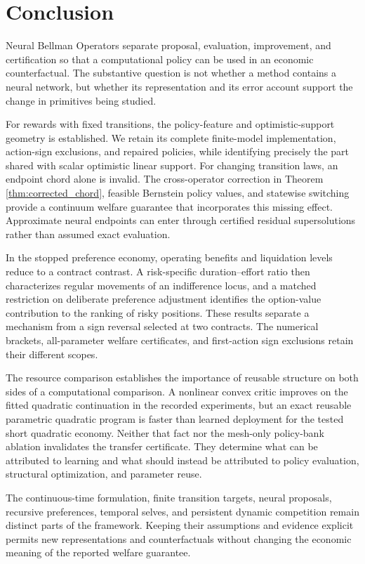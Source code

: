 \section{Conclusion}
Neural Bellman Operators separate proposal, evaluation, improvement, and certification so that a computational policy can be used in an economic counterfactual. The substantive question is not whether a method contains a neural network, but whether its representation and its error account support the change in primitives being studied.

For rewards with fixed transitions, the policy-feature and optimistic-support geometry is established. We retain its complete finite-model implementation, action-sign exclusions, and repaired policies, while identifying precisely the part shared with scalar optimistic linear support. For changing transition laws, an endpoint chord alone is invalid. The cross-operator correction in Theorem \ref{thm:corrected_chord}, feasible Bernstein policy values, and statewise switching provide a continuum welfare guarantee that incorporates this missing effect. Approximate neural endpoints can enter through certified residual supersolutions rather than assumed exact evaluation.

In the stopped preference economy, operating benefits and liquidation levels reduce to a contract contrast. A risk-specific duration--effort ratio then characterizes regular movements of an indifference locus, and a matched restriction on deliberate preference adjustment identifies the option-value contribution to the ranking of risky positions. These results separate a mechanism from a sign reversal selected at two contracts. The numerical brackets, all-parameter welfare certificates, and first-action sign exclusions retain their different scopes.

The resource comparison establishes the importance of reusable structure on both sides of a computational comparison. A nonlinear convex critic improves on the fitted quadratic continuation in the recorded experiments, but an exact reusable parametric quadratic program is faster than learned deployment for the tested short quadratic economy. Neither that fact nor the mesh-only policy-bank ablation invalidates the transfer certificate. They determine what can be attributed to learning and what should instead be attributed to policy evaluation, structural optimization, and parameter reuse.

The continuous-time formulation, finite transition targets, neural proposals, recursive preferences, temporal selves, and persistent dynamic competition remain distinct parts of the framework. Keeping their assumptions and evidence explicit permits new representations and counterfactuals without changing the economic meaning of the reported welfare guarantee.
